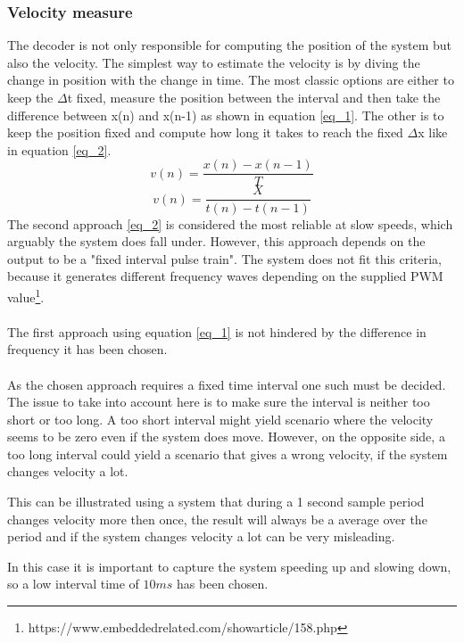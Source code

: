 \documentclass[../../../main]{subfiles}
\begin{document}
\subsubsection{Velocity measure}
The decoder is not only responsible for computing the position of the system but also the velocity. The simplest way to estimate the velocity is by diving the change in position with the change in time. The most classic options are either to keep the $\Delta$t fixed, measure the position between the interval and then take the difference between x(n) and x(n-1) as shown in equation \ref{eq_1}. The other is to keep the position fixed and compute how long it takes to reach the fixed  $\Delta$x like in equation \ref{eq_2}.
\begin{equation}
v(n) = \frac{x(n)-x(n-1)}{T}
\label{eq_1}
\end{equation}
\begin{equation}
  v(n) = \frac{X}{t(n)-t(n-1)}
  \label{eq_2}
\end{equation}
The second approach \ref{eq_2} is considered the most reliable at slow speeds, which arguably the system does fall under. However, this approach depends on the output to be a "fixed interval pulse train". The system does not fit this criteria, because it generates different frequency waves depending on the supplied PWM value\footnote{https://www.embeddedrelated.com/showarticle/158.php}.\\
\\
The first approach using equation \ref{eq_1} is not hindered by the difference in frequency it has been chosen.  \\
\\
 As the chosen approach requires a fixed time interval one such must be decided. The issue to take into account here is to make sure the interval is neither too short or too long. A too short interval might yield scenario where the velocity seems to be zero even if the system does move. However, on the opposite side, a too long interval could yield a scenario that gives a wrong velocity, if the system changes velocity a lot.

This can be illustrated using a system that during a 1 second sample period changes velocity more then once, the result will always be a average over the period and if the system changes velocity a lot can be very misleading.

In this case it is important to capture the system speeding up and slowing down, so a low interval time of $10ms$ has been chosen.
\end{document}
